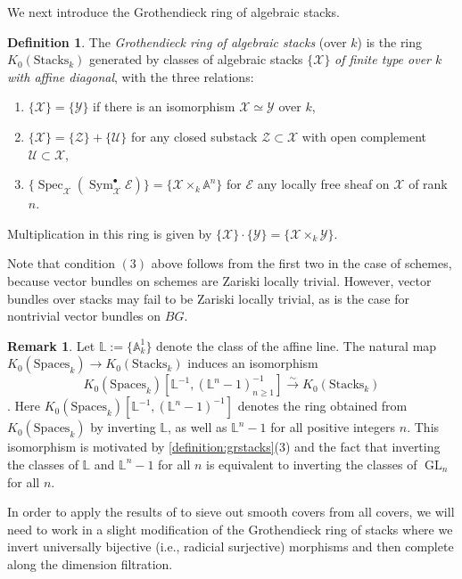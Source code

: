 \documentclass[12 pt]{amsart}
\newcommand{\rboxed}[1]{#1}
\theoremstyle{plain}
\theoremstyle{definition}
\newtheorem{definition}[theorem]{Definition}
\newtheorem{remark}[theorem]{Remark}
\theoremstyle{remark}
\numberwithin{equation}{section}
\newcommand\ba{\mathbb A}
\newcommand\bl{\mathbb L}
\newcommand\sce{\mathscr E}
\newcommand\scu{\mathscr U}
\newcommand\scx{\mathscr X}
\newcommand\scy{\mathscr Y}
\newcommand\scz{\mathscr Z}
\DeclareMathOperator\spec{\operatorname{Spec}}
\newcommand\grSpaces{K_0(\mathrm{Spaces}_k)} %
\newcommand\grStacks{K_0(\mathrm{Stacks}_k)} %
\DeclareMathOperator\sym{Sym}
\DeclareMathOperator\gl{GL}
\begin{document}
We next introduce the Grothendieck ring of algebraic stacks.
      \begin{definition} \label{definition:grstacks} The
        {\em Grothendieck ring of algebraic stacks} (over
        $k$) is the ring $\rboxed{\grStacks}$ generated by classes of
        algebraic stacks $\{\scx\}$ {\em of finite type over $k$ with affine
        diagonal}, with the three relations:
	\begin{enumerate}
		\item $\{\scx\} = \{\scy\}$ if there is an isomorphism $\scx
			\simeq \scy$ over $k$,
\item $\{\scx\} = \{\scz\} + \{\scu\}$ for any
	closed substack $\scz \subset \scx$ with open complement $\scu \subset
	\scx$,
\item  $\{\spec_\scx (\sym^\bullet_\scx \sce)\} = \{\scx \times_k \ba^n\}$
	for $\sce$ any locally free sheaf on
	$\scx$ of rank $n$.  
	\end{enumerate}
	Multiplication in this ring is given by $\{\scx\} \cdot \{\scy\} = \{\scx \times_k
\scy\}$. 
 \end{definition}

Note that condition $(3)$ above follows
from the first two in the case of schemes, because vector bundles on schemes are
Zariski locally trivial.
However, vector bundles over stacks may
fail to be Zariski locally trivial, as is the case for nontrivial vector bundles
on $BG$.

\begin{remark} \label{remark:ekedahl-grstacks-equivalence} Let  $\rboxed{\bl}
	:= \{\ba^1_k\}$ denote the class of the affine line.  The natural map $\grSpaces \to
	\grStacks$ induces an isomorphism
	$$\grSpaces[\bl^{-1}, (\bl^n-1)^{-1}_{n \geq 1}] \overset \sim
        \longrightarrow
	\grStacks$$
        	\cite[Thm.\  1.2]{Ekedahl2009}.  Here
	$\grSpaces[\bl^{-1}, (\bl^n-1)^{-1}]$ denotes the ring obtained
	from
	$\grSpaces$ by inverting  $\bl$, as well as 
	$\bl^n - 1$ for all positive integers $n$.
	This isomorphism is motivated by 
	\autoref{definition:grstacks}(3)
	and the fact that
	inverting the classes of $\bl$ and $\bl^n -1$ for all $n$
	is equivalent to inverting the classes of $\gl_n$ for all $n$.
\end{remark}

In order to apply the results of
\cite{biluH:motivic-euler-products-in-motivic-statistics} to sieve out smooth
covers from all covers, we will need to work in a slight modification of the
Grothendieck ring of stacks where we invert universally bijective
(i.e., radicial surjective) morphisms and
then complete along the dimension filtration.  
\end{document}
